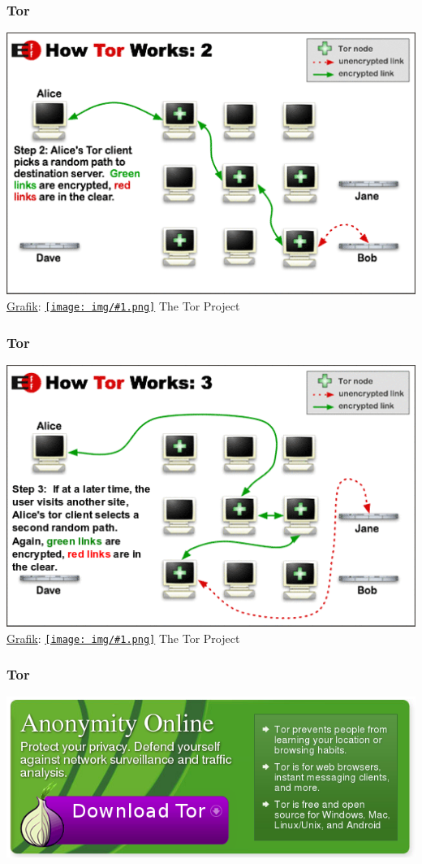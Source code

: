 \documentclass[12pt]{beamer}
\newcommand{\cc}[1]{\texttt{[image: img/\#1.png]}\hspace{1mm}}
\begin{document}
\begin{frame}
    \frametitle{Tor}
    \includegraphics[height=0.7\textheight]{img/tor2.png}
    \\{\small \href{https://www.torproject.org/images/htw2.png}{Grafik}: \href{https://creativecommons.org/licenses/by/3.0/us/}{\cc{by}} The Tor Project}
\end{frame}

\begin{frame}
    \frametitle{Tor}
    \includegraphics[height=0.7\textheight]{img/tor3.png}
    \\{\small \href{https://www.torproject.org/images/htw3.png}{Grafik}: \href{https://creativecommons.org/licenses/by/3.0/us/}{\cc{by}} The Tor Project}
\end{frame}

\begin{frame}
  \frametitle{Tor}
  \includegraphics[height=0.5\textheight]{img/tor-banner.png}
\end{frame}
\end{document}
